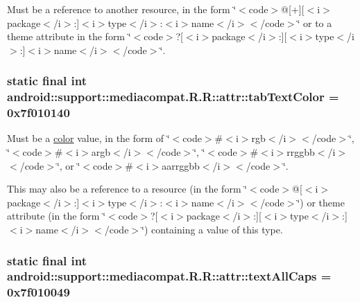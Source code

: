 Must be a reference to another resource, in the form \char`\"{}$<$code$>$@\mbox{[}+\mbox{]}\mbox{[}$<$i$>$package$<$/i$>$:\mbox{]}$<$i$>$type$<$/i$>$:$<$i$>$name$<$/i$>$$<$/code$>$\char`\"{} or to a theme attribute in the form \char`\"{}$<$code$>$?\mbox{[}$<$i$>$package$<$/i$>$:\mbox{]}\mbox{[}$<$i$>$type$<$/i$>$:\mbox{]}$<$i$>$name$<$/i$>$$<$/code$>$\char`\"{}. \hypertarget{classandroid_1_1support_1_1mediacompat_1_1_r_1_1attr_1edcf23ccb24a49f628e598d4afaa703}{
\subsubsection[{tabTextColor}]{\setlength{\rightskip}{0pt plus 5cm}static final int android::support::mediacompat.R.R::attr::tabTextColor = 0x7f010140}}
\label{classandroid_1_1support_1_1mediacompat_1_1_r_1_1attr_1edcf23ccb24a49f628e598d4afaa703}


Must be a \hyperlink{classandroid_1_1support_1_1mediacompat_1_1_r_1_1color}{color} value, in the form of \char`\"{}$<$code$>$\#$<$i$>$rgb$<$/i$>$$<$/code$>$\char`\"{}, \char`\"{}$<$code$>$\#$<$i$>$argb$<$/i$>$$<$/code$>$\char`\"{}, \char`\"{}$<$code$>$\#$<$i$>$rrggbb$<$/i$>$$<$/code$>$\char`\"{}, or \char`\"{}$<$code$>$\#$<$i$>$aarrggbb$<$/i$>$$<$/code$>$\char`\"{}. 

This may also be a reference to a resource (in the form \char`\"{}$<$code$>$@\mbox{[}$<$i$>$package$<$/i$>$:\mbox{]}$<$i$>$type$<$/i$>$:$<$i$>$name$<$/i$>$$<$/code$>$\char`\"{}) or theme attribute (in the form \char`\"{}$<$code$>$?\mbox{[}$<$i$>$package$<$/i$>$:\mbox{]}\mbox{[}$<$i$>$type$<$/i$>$:\mbox{]}$<$i$>$name$<$/i$>$$<$/code$>$\char`\"{}) containing a value of this type. \hypertarget{classandroid_1_1support_1_1mediacompat_1_1_r_1_1attr_77f4f7376b95eef16ef8af40983c5f4e}{
\subsubsection[{textAllCaps}]{\setlength{\rightskip}{0pt plus 5cm}static final int android::support::mediacompat.R.R::attr::textAllCaps = 0x7f010049}}
\label{classandroid_1_1support_1_1mediacompat_1_1_r_1_1attr_77f4f7376b95eef16ef8af40983c5f4e}


